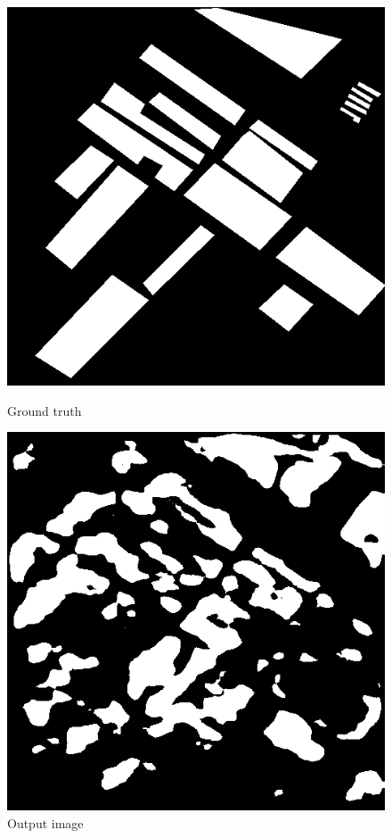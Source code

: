 \documentclass[]{IEEEtran}
\begin{document}
\begin{figure}
	\begin{minipage}[t]{0.5\linewidth}
		\centering
		\includegraphics[width=0.9\columnwidth]{SAR01-00171_gt}
		\caption{Ground truth}
		\label{fig:gt}
	\end{minipage}%
	\begin{minipage}[t]{0.5\linewidth}
		\centering
		\includegraphics[width=0.9\columnwidth]{SAR01-00171_pred}
		\caption{Output image}
		\label{fig:out}
	\end{minipage}
\end{figure}
\end{document}

